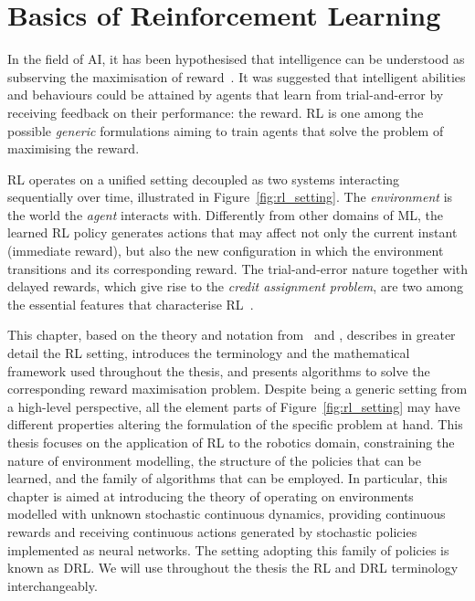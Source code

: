 \chapter{Basics of Reinforcement Learning}
\label{ch:reinforcement_learning}

In the field of \ac{AI}, it has been hypothesised that intelligence can be understood as subserving the maximisation of reward~\parencite{silver_reward_2021}.
It was suggested that intelligent abilities and behaviours could be attained by agents that learn from trial-and-error by receiving feedback on their performance: the reward.
\ac{RL} is one among the possible \emph{generic} formulations aiming to train agents that solve the problem of maximising the reward.

\acl{RL} operates on a unified setting decoupled as two systems interacting sequentially over time, illustrated in Figure~\ref{fig:rl_setting}.
The \emph{environment} is the world the \emph{agent} interacts with.
Differently from other domains of \ac{ML}, the learned \ac{RL} policy generates actions that may affect not only the current instant (immediate reward), but also the new configuration in which the environment transitions and its corresponding reward.
The trial-and-error nature together with delayed rewards, which give rise to the \emph{credit assignment problem}, are two among the essential features that characterise \acs{RL}~\parencite{sutton_reinforcement_2018}.

This chapter, based on the theory and notation from~\textcite{achiam_spinning_2018} and \textcite{dong_deep_2020}, describes in greater detail the \acl{RL} setting, introduces the terminology and the mathematical framework used throughout the thesis, and presents algorithms to solve the corresponding reward maximisation problem.
Despite being a generic setting from a high-level perspective, all the element parts of Figure~\ref{fig:rl_setting} may have different properties altering the formulation of the specific problem at hand.
This thesis focuses on the application of \ac{RL} to the robotics domain, constraining the nature of environment modelling, the structure of the policies that can be learned, and the family of algorithms that can be employed.
In particular, this chapter is aimed at introducing the theory of operating on environments modelled with unknown stochastic continuous dynamics, providing continuous rewards and receiving continuous actions generated by stochastic policies implemented as neural networks.
The setting adopting this family of policies is known as \ac{DRL}.
We will use throughout the thesis the \ac{RL} and \ac{DRL} terminology interchangeably.

